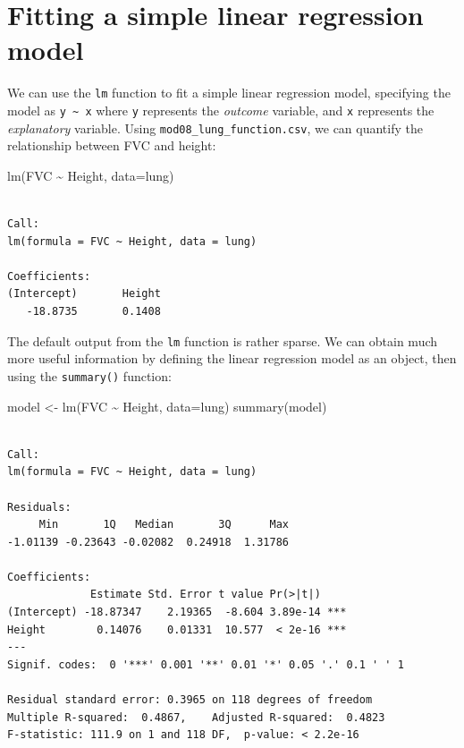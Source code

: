 \documentclass[
  a4paper,
]{memoir}
\newenvironment{Shaded}{\begin{snugshade}}{\end{snugshade}}
\newcommand{\AttributeTok}[1]{\textcolor[rgb]{0.00,0.00,0.00}{#1}}
\newcommand{\FunctionTok}[1]{\textcolor[rgb]{0.00,0.00,0.00}{#1}}
\newcommand{\NormalTok}[1]{\textcolor[rgb]{0.00,0.00,0.00}{#1}}
\newcommand{\OtherTok}[1]{\textcolor[rgb]{0.00,0.00,0.00}{#1}}
\newcommand{\SpecialCharTok}[1]{\textcolor[rgb]{0.00,0.00,0.00}{#1}}
\begin{document}
\section{Fitting a simple linear regression
model}\label{fitting-a-simple-linear-regression-model-1}

We can use the \texttt{lm} function to fit a simple linear regression
model, specifying the model as \texttt{y\ \textasciitilde{}\ x} where
\texttt{y} represents the \emph{outcome} variable, and \texttt{x}
represents the \emph{explanatory} variable. Using
\texttt{mod08\_lung\_function.csv}, we can quantify the relationship
between FVC and height:

\begin{Shaded}
\begin{Highlighting}[]
\FunctionTok{lm}\NormalTok{(FVC }\SpecialCharTok{\textasciitilde{}}\NormalTok{ Height, }\AttributeTok{data=}\NormalTok{lung)}
\end{Highlighting}
\end{Shaded}

\begin{verbatim}

Call:
lm(formula = FVC ~ Height, data = lung)

Coefficients:
(Intercept)       Height  
   -18.8735       0.1408  
\end{verbatim}

The default output from the \texttt{lm} function is rather sparse. We
can obtain much more useful information by defining the linear
regression model as an object, then using the \texttt{summary()}
function:

\begin{Shaded}
\begin{Highlighting}[]
\NormalTok{model }\OtherTok{\textless{}{-}} \FunctionTok{lm}\NormalTok{(FVC }\SpecialCharTok{\textasciitilde{}}\NormalTok{ Height, }\AttributeTok{data=}\NormalTok{lung)}
\FunctionTok{summary}\NormalTok{(model)}
\end{Highlighting}
\end{Shaded}

\begin{verbatim}

Call:
lm(formula = FVC ~ Height, data = lung)

Residuals:
     Min       1Q   Median       3Q      Max 
-1.01139 -0.23643 -0.02082  0.24918  1.31786 

Coefficients:
             Estimate Std. Error t value Pr(>|t|)    
(Intercept) -18.87347    2.19365  -8.604 3.89e-14 ***
Height        0.14076    0.01331  10.577  < 2e-16 ***
---
Signif. codes:  0 '***' 0.001 '**' 0.01 '*' 0.05 '.' 0.1 ' ' 1

Residual standard error: 0.3965 on 118 degrees of freedom
Multiple R-squared:  0.4867,    Adjusted R-squared:  0.4823 
F-statistic: 111.9 on 1 and 118 DF,  p-value: < 2.2e-16
\end{verbatim}
\end{document}
